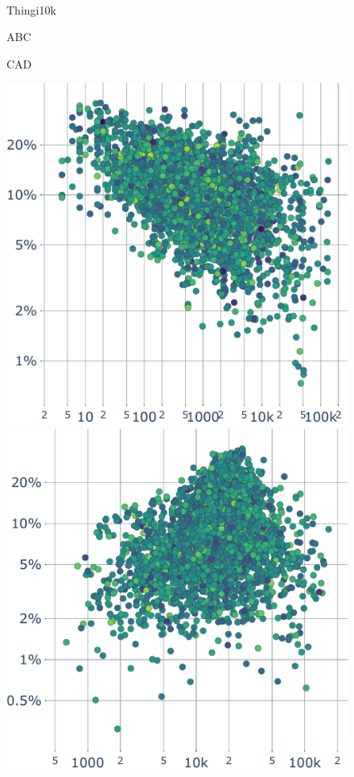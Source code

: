 \begin{figure}
    \centering
    \parbox{0.02\linewidth}{~}\hfill\hfill
    \parbox{.3\linewidth}{\centering Thingi10k}\hfill
    \parbox{.3\linewidth}{\centering ABC}\hfill
    \parbox{.3\linewidth}{\centering CAD}\par
    \parbox{0.02\linewidth}{\centering{}}\hfill\hfill
    \parbox{.3\linewidth}{\includegraphics[width=\linewidth]{curve_meshing_in_shell_tex/figs/stats/edgelength_Thingi10k}}\hfill
    \parbox{.3\linewidth}{\includegraphics[width=\linewidth]{curve_meshing_in_shell_tex/figs/stats/edgelength_ABC}}\hfill

\end{figure}
